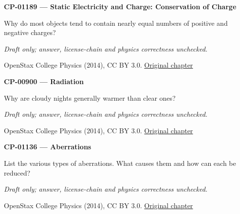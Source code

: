 \par\medskip
\noindent\textbf{CP-01189 — Static Electricity and Charge: Conservation of Charge}
\par Why do most objects tend to contain nearly equal numbers of positive and negative charges?
\par\smallskip
\textit{Draft only; answer, license-chain and physics correctness unchecked.}
\par{\footnotesize OpenStax College Physics (2014), CC BY 3.0. \href{https://github.com/philschatz/physics-book/blob/a7efaa7e221fab1694022d8bb98b83a73ee31d3d/contents/m42300.md}{Original chapter}}\par\normalsize

\par\medskip
\noindent\textbf{CP-00900 — Radiation}
\par Why are cloudy nights generally warmer than clear ones?
\par\smallskip
\textit{Draft only; answer, license-chain and physics correctness unchecked.}
\par{\footnotesize OpenStax College Physics (2014), CC BY 3.0. \href{https://github.com/philschatz/physics-book/blob/a7efaa7e221fab1694022d8bb98b83a73ee31d3d/contents/m42230.md}{Original chapter}}\par\normalsize

\par\medskip
\noindent\textbf{CP-01136 — Aberrations}
\par List the various types of aberrations. What causes them and how can each be reduced?
\par\smallskip
\textit{Draft only; answer, license-chain and physics correctness unchecked.}
\par{\footnotesize OpenStax College Physics (2014), CC BY 3.0. \href{https://github.com/philschatz/physics-book/blob/a7efaa7e221fab1694022d8bb98b83a73ee31d3d/contents/m42292.md}{Original chapter}}\par\normalsize

